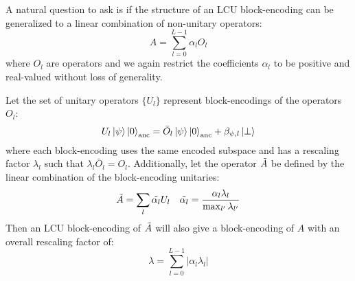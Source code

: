A natural question to ask is if the structure of an LCU block-encoding can be generalized to a linear combination of non-unitary operators:
\begin{equation}
    \label{eq:lco}
    A = \sum_{l=0}^{L-1} \alpha_l O_l
\end{equation}
where $O_l$ are operators and we again restrict the coefficients $\alpha_l$ to be positive and real-valued without loss of generality.

Let the set of unitary operators $\{U_l\}$ represent block-encodings of the operators $O_l$:
\begin{equation}
    \label{eq:applying-operator}
    U_l \ket{\psi}\ket{0}_\text{anc} = \bar{O}_l \ket{\psi} \ket{0}_\text{anc} + \beta_{\psi, l} \ket{\perp}
\end{equation}
where each block-encoding uses the same encoded subspace and has a rescaling factor $\lambda_l$ such that $\lambda_l \bar{O}_l = O_l$.
Additionally, let the operator $\Tilde{A}$ be defined by the linear combination of the block-encoding unitaries:
\begin{equation}
    \Tilde{A} = \sum_{l} \Tilde{\alpha_l} U_l \hspace{1em} \Tilde{\alpha_l} = \frac{\alpha_l \lambda_l}{\max_{l^\prime}{\lambda_{l^\prime}}}
\end{equation} 
Then an LCU block-encoding of $\Tilde{A}$ will also give a block-encoding of $A$ with an overall rescaling factor of:
\begin{equation}
    \lambda = \sum_{l=0}^{L-1} |\alpha_l \lambda_l|
\end{equation}

